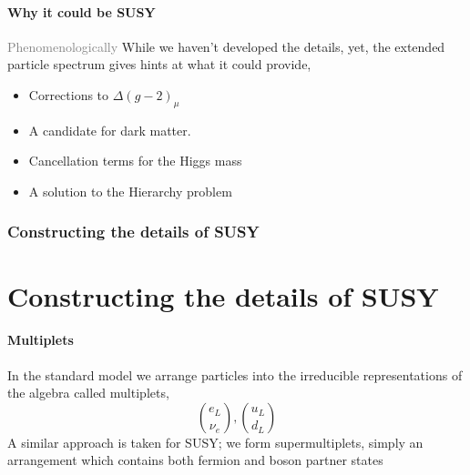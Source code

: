 \documentclass{beamer}
\begin{document}
\subsection{Why it could be SUSY}
\begin{frame}{\insertsubsection}
  \textcolor{gray}{Phenomenologically}
  While we haven't developed the details, yet, the extended particle spectrum
  gives hints at what it \alert{could} provide,
  \begin{itemize}
    \item Corrections to $\Delta(g-2)_{\mu}$
    \item A candidate for dark matter.
    \item Cancellation terms for the Higgs mass
    \item A solution to the Hierarchy problem
  \end{itemize}
\end{frame}


\section{Constructing the details of SUSY}
\part{Constructing the details of SUSY}
\frame{\partpage}

\subsection{Multiplets}
\begin{frame}{\insertsubsection}
In the standard model we arrange particles into the \alert{irreducible
representations} of the
algebra called multiplets,
  \begin{equation*}
    \binom{e_L}{\nu_{e}},\binom{u_{L}}{d_{L}}
  \end{equation*}
A similar approach is taken for SUSY; we form \alert{supermultiplets}, simply an
arrangement which contains both fermion and boson partner states
\end{frame}
\end{document}
